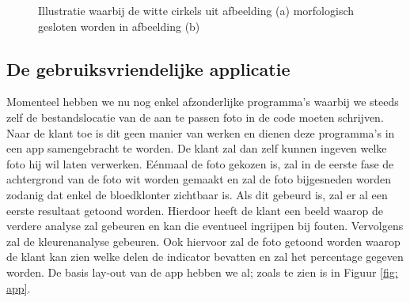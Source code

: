 \documentclass[a4paper,kulak]{kulakarticle}
\begin{document}
	\begin{figure}[H]
		\centering
		\qquad
		
		\caption{Illustratie waarbij de witte cirkels uit afbeelding (a) morfologisch gesloten worden in afbeelding (b)}
		\label{figuur morf}
	\end{figure}

	\subsection{De gebruiksvriendelijke applicatie}
		Momenteel hebben we nu nog enkel afzonderlijke programma's waarbij we steeds zelf de bestandslocatie van de aan te passen foto in de code moeten schrijven. Naar de klant toe is dit geen manier van werken en dienen deze programma's in een app samengebracht te worden. De klant zal dan zelf kunnen ingeven welke foto hij wil laten verwerken. Eénmaal de foto gekozen is, zal in de eerste fase de achtergrond van de foto wit worden gemaakt en zal de foto bijgesneden worden zodanig dat enkel de bloedklonter zichtbaar is. Als dit gebeurd is, zal er al een eerste resultaat getoond worden. Hierdoor heeft de klant een beeld waarop de verdere analyse zal gebeuren en kan die eventueel ingrijpen bij fouten. Vervolgens zal de kleurenanalyse gebeuren. Ook hiervoor zal de foto getoond worden waarop de klant kan zien welke delen de indicator bevatten en zal het percentage gegeven worden. De basis lay-out van de app hebben we al; zoals te zien is in Figuur \ref{fig: app}.
	
\end{document}
